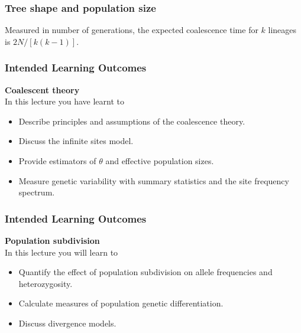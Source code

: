 \documentclass{beamer}
\newcommand{\1}{\ensuremath{\mathbf{1}}}
\begin{document}
%
%
%
\begin{frame}\frametitle{Tree shape and population size}
	Measured in number of generations, the expected coalescence time for $k$ lineages is $2N/[k(k - 1)]$.
	\begin{center}
	\end{center}
\end{frame}
%
%
%
\begin{frame}\frametitle{Intended Learning Outcomes}
	\textbf{Coalescent theory}\\[2ex]
	In this lecture you have learnt to
	\begin{itemize}
		\item Describe principles and assumptions of the coalescence theory.
		\item Discuss the infinite sites model.
		\item Provide estimators of $\theta$ and effective population sizes.
		\item Measure genetic variability with summary statistics and the site frequency spectrum.
	\end{itemize}
\end{frame}
%
%
%
\begin{frame}\frametitle{Intended Learning Outcomes}
	\textbf{Population subdivision}\\[2ex]
	In this lecture you will learn to
	\begin{itemize}
		\item Quantify the effect of population subdivision on allele frequencies and heterozygosity.
		\item Calculate measures of population genetic differentiation.
		\item Discuss divergence models.
	\end{itemize}
\end{frame}
%
%
%
\end{document}
